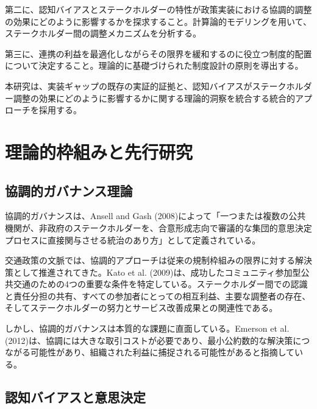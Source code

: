 第二に、認知バイアスとステークホルダーの特性が政策実装における協調的調整の効果にどのように影響するかを探求すること。計算論的モデリングを用いて、ステークホルダー間の調整メカニズムを分析する。

第三に、連携の利益を最適化しながらその限界を緩和するのに役立つ制度的配置について決定すること。理論的に基礎づけられた制度設計の原則を導出する。

本研究は、実装ギャップの既存の実証的証拠と、認知バイアスがステークホルダー調整の効果にどのように影響するかに関する理論的洞察を統合する統合的アプローチを採用する。

\section{理論的枠組みと先行研究}
\label{sec:ch4_framework}

\subsection{協調的ガバナンス理論}

協調的ガバナンスは、Ansell and Gash (2008)によって「一つまたは複数の公共機関が、非政府のステークホルダーを、合意形成志向で審議的な集団的意思決定プロセスに直接関与させる統治のあり方」として定義されている。

交通政策の文脈では、協調的アプローチは従来の規制枠組みの限界に対する解決策として推進されてきた。Kato et al. (2009)は、成功したコミュニティ参加型公共交通のための4つの重要な条件を特定している。ステークホルダー間での認識と責任分担の共有、すべての参加者にとっての相互利益、主要な調整者の存在、そしてステークホルダーの努力とサービス改善成果との関連性である。

しかし、協調的ガバナンスは本質的な課題に直面している。Emerson et al. (2012)は、協調には大きな取引コストが必要であり、最小公約数的な解決策につながる可能性があり、組織された利益に捕捉される可能性があると指摘している。

\subsection{認知バイアスと意思決定}

